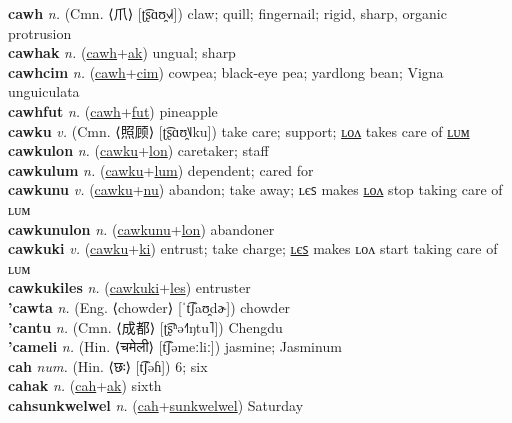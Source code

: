 \textbf{cawh} \textit{n.} (Cmn. ⟨爪⟩ [ʈ͡ʂɑʊ̯˧˩˧])
claw; quill; fingernail; rigid, sharp, organic protrusion \label{cawh} \\
\textbf{cawhak} \textit{n.} (\hyperref[cawh]{cawh}+\hyperref[ak]{ak})
ungual; sharp \label{cawhak} \\
\textbf{cawhcim} \textit{n.} (\hyperref[cawh]{cawh}+\hyperref[cim]{cim})
cowpea; black-eye pea; yardlong bean; Vigna unguiculata \label{cawhcim} \\
\textbf{cawhfut} \textit{n.} (\hyperref[cawh]{cawh}+\hyperref[fut]{fut})
pineapple \label{cawhfut} \\
\textbf{cawku} \textit{v.} (Cmn. ⟨照顾⟩ [ʈ͡ʂɑʊ̯˥˩ku])
take care; support; \hyperref[cawkulon]{ʟᴏᴧ} takes care of \hyperref[cawkulum]{ʟᴜᴍ} \label{cawku} \\
\textbf{cawkulon} \textit{n.} (\hyperref[cawku]{cawku}+\hyperref[lon]{lon})
caretaker; staff \label{cawkulon} \\
\textbf{cawkulum} \textit{n.} (\hyperref[cawku]{cawku}+\hyperref[lum]{lum})
dependent; cared for \label{cawkulum} \\
\textbf{cawkunu} \textit{v.} (\hyperref[cawku]{cawku}+\hyperref[nu]{nu})
abandon; take away; ʟєꜱ makes \hyperref[cawkunulon]{ʟᴏᴧ} stop taking care of ʟᴜᴍ \label{cawkunu} \\
\textbf{cawkunulon} \textit{n.} (\hyperref[cawkunu]{cawkunu}+\hyperref[lon]{lon})
abandoner \label{cawkunulon} \\
\textbf{cawkuki} \textit{v.} (\hyperref[cawku]{cawku}+\hyperref[ki]{ki})
entrust; take charge; \hyperref[cawkukiles]{ʟєꜱ} makes ʟᴏᴧ start taking care of ʟᴜᴍ \label{cawkuki} \\
\textbf{cawkukiles} \textit{n.} (\hyperref[cawkuki]{cawkuki}+\hyperref[les]{les})
entruster \label{cawkukiles} \\
\textbf{'cawta} \textit{n.} (Eng. ⟨chowder⟩ [ˈt͡ʃaʊ̯dɚ])
chowder \label{'cawta} \\
\textbf{'cantu} \textit{n.} (Cmn. ⟨成都⟩ [ʈ͡ʂʰə˧˥ŋtu˥])
Chengdu \label{'cantu} \\
\textbf{'cameli} \textit{n.} (Hin. ⟨चमेली⟩ [t͡ʃəmeːliː])
jasmine; Jasminum \label{'cameli} \\
\textbf{cah} \textit{num.} (Hin. ⟨छः⟩ [t͡ʃəɦ])
6; six \label{cah} \\
\textbf{cahak} \textit{n.} (\hyperref[cah]{cah}+\hyperref[ak]{ak})
sixth \label{cahak} \\
\textbf{cahsunkwelwel} \textit{n.} (\hyperref[cah]{cah}+\hyperref[sunkwelwel]{sunkwelwel})
Saturday \label{cahsunkwelwel} \\

